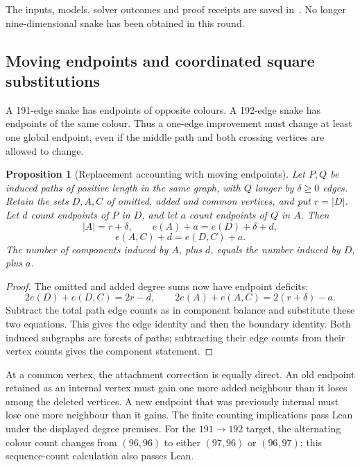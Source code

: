 \documentclass[11pt,a4paper]{article}
\newtheorem{proposition}[theorem]{Proposition}
\theoremstyle{definition}
\theoremstyle{remark}
\begin{document}
The inputs, models, solver outcomes and proof receipts are saved
in~\cite{replacement191archive}. No longer nine-dimensional snake has
been obtained in this round.


\subsection{Moving endpoints and coordinated square substitutions}
\label{sec:moving-endpoints}
A 191-edge snake has endpoints of opposite colours. A 192-edge snake
has endpoints of the same colour. Thus a one-edge improvement must
change at least one global endpoint, even if the middle path and both
crossing vertices are allowed to change.

\begin{proposition}[Replacement accounting with moving endpoints]
Let $P,Q$ be induced paths of positive length in the same graph, with
$Q$ longer by $\delta\ge0$ edges. Retain the sets $D,A,C$ of omitted,
added and common vertices, and put $r=|D|$. Let $d$ count endpoints of
$P$ in $D$, and let $a$ count endpoints of $Q$ in $A$. Then
\[
|A|=r+\delta,\qquad e(A)+a=e(D)+\delta+d,
\]
\[
e(A,C)+d=e(D,C)+a.
\]
The number of components induced by $A$, plus $d$, equals the number
induced by $D$, plus $a$.
\end{proposition}
\begin{proof}
The omitted and added degree sums now have endpoint deficits:
\[
2e(D)+e(D,C)=2r-d,\qquad
2e(A)+e(A,C)=2(r+\delta)-a.
\]
Subtract the total path edge counts as in component balance and
substitute these two equations. This gives the edge identity and then
the boundary identity. Both induced subgraphs are forests of paths;
subtracting their edge counts from their vertex counts gives the
component statement.
\end{proof}
At a common vertex, the attachment correction is equally direct.
An old endpoint retained as an internal vertex must gain one more
added neighbour than it loses among the deleted vertices. A new
endpoint that was previously internal must lose one more neighbour
than it gains. The finite counting implications pass Lean under the
displayed degree premises. For the $191\to192$ target, the alternating
colour count changes from $(96,96)$ to either $(97,96)$ or $(96,97)$;
this sequence-count calculation also passes Lean.
\end{document}
